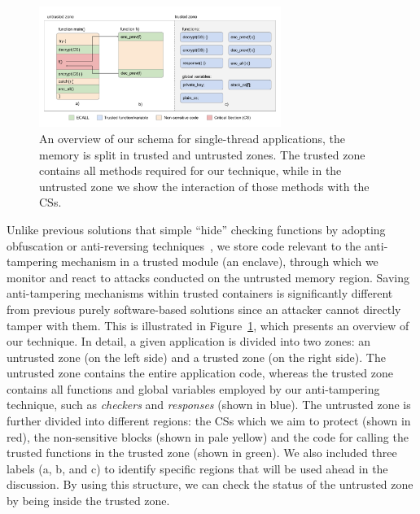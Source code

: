 \begin{figure}[t]
	\centering
	\includegraphics[width=0.7\textwidth]{fig_c3/core-all.pdf}
	\caption[Overview of single-thread schema.]{An overview of our schema for 
	single-thread applications, the memory is split in trusted and untrusted 
	zones. The trusted zone contains all methods required for our technique, 
	while in the untrusted zone we show the interaction of those methods with 
	the CSs.}
	\label{fig:core-all}
\end{figure}

Unlike previous solutions that simple ``hide'' checking functions by adopting
obfuscation or anti-reversing 
techniques~\cite{banescu2017tutorial,chang2001protecting,chen2016advanced,viticchie2016reactive},
 we store
code relevant to the anti-tampering mechanism in a trusted module (\ie an 
enclave),
through which we monitor and react to attacks conducted on
the untrusted memory region.
Saving anti-tampering mechanisms within trusted containers is significantly 
different from previous purely software-based solutions since an attacker 
cannot directly tamper with them.
This is illustrated in Figure~\ref{fig:core-all}, which presents an overview of 
our technique.
In detail, a given application is divided into two zones: an untrusted zone (on 
the left side) and a trusted zone (on the right side).
The untrusted zone contains the entire application code,
whereas the trusted zone contains all functions and global variables employed 
by our anti-tampering technique, such as \emph{checkers} and \emph{responses} 
(shown in blue).
The untrusted zone is further divided into different regions: the CSs which we 
aim to protect (shown in red), the non-sensitive blocks (shown in pale yellow) 
and the code for calling the trusted functions in the trusted zone (shown in 
green).
We also included three labels (\ie a, b, and c) to identify specific regions 
that will be used ahead in the discussion.
By using this structure, we can check the status of the untrusted zone by being 
inside the trusted zone.

